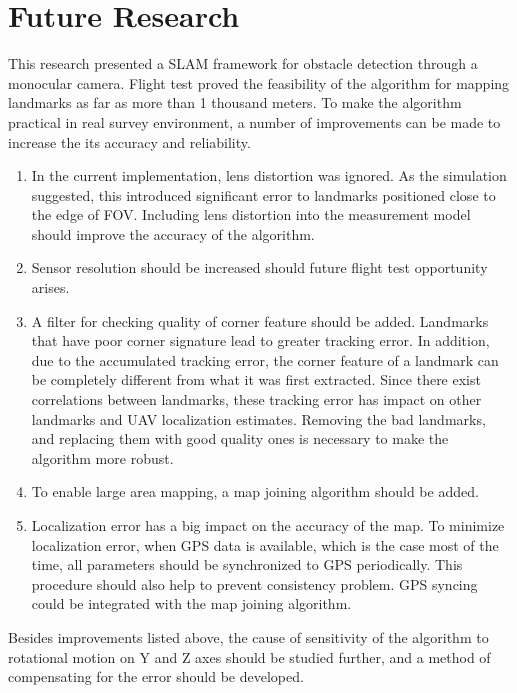 \section{Future Research}
This research presented a SLAM framework for obstacle detection
through a monocular camera. Flight test proved the feasibility of the
algorithm for mapping landmarks as far as more than 1 thousand meters.
To make the algorithm practical in real survey environment, a number
of improvements can be made to increase the its accuracy and reliability.
\begin{enumerate}
  \item In the current implementation, lens distortion was ignored. As
  the simulation suggested, this introduced significant error to
  landmarks positioned close to the edge of FOV. Including lens
  distortion into the measurement model should improve the accuracy of
  the algorithm.
  \item Sensor resolution should be increased should future flight
  test opportunity arises.
  \item A filter for checking quality of corner feature should be
  added. Landmarks that have poor corner signature lead to greater
  tracking error. In addition, due to the accumulated tracking error,
  the corner feature of a landmark can be completely different from
  what it was first extracted. Since there exist correlations between
  landmarks, these tracking error has impact on other landmarks and
  UAV localization estimates. Removing the bad landmarks, and
  replacing them with good quality ones is necessary to make the
  algorithm more robust.
  \item To enable large area mapping, a map joining algorithm should
  be added.
  \item Localization error has a big impact on the accuracy of the
  map. To minimize localization error, when GPS data is available,
  which is the case most of the time, all parameters should be
  synchronized to GPS periodically. This procedure should also help to
  prevent consistency problem. GPS syncing could be integrated with
  the map joining algorithm.
\end{enumerate}

Besides improvements listed above, the cause of sensitivity of the
algorithm to rotational motion on Y and Z axes should be studied
further, and a method of compensating for the error should be
developed.

